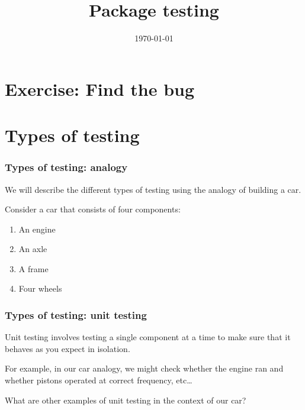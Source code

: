 \documentclass[10pt]{beamer}
\title{Package testing}
\date[]{\today}
\begin{document}
\begin{frame}
  \titlepage
\end{frame}


\section{Exercise: Find the bug}


\section{Types of testing}

  \begin{frame} \frametitle{Types of testing: analogy}

    We will describe the different types of testing using the analogy of building a car.

    \vspace{0.25cm}

    Consider a car that consists of four components:

    \begin{enumerate}
      \item An engine
      \item An axle
      \item A frame
      \item Four wheels
    \end{enumerate}

  \end{frame}

  \begin{frame} \frametitle{Types of testing: unit testing}

    Unit testing involves testing a single component at a time to make sure that it
    behaves as you expect in isolation.

    \vspace{0.25cm}

    For example, in our car analogy, we might check whether the engine ran and whether
    pistons operated at correct frequency, etc\dots

    \vspace{0.25cm}

    What are other examples of unit testing in the context of our car?

  \end{frame}
\end{document}
